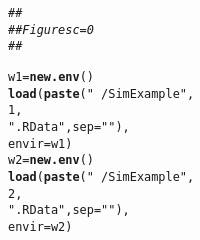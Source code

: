 \documentclass[12pt,letterpaper,final]{article}\usepackage[]{graphicx}\usepackage[]{color}
\makeatletter
\newcommand{\hlnum}[1]{\textcolor[rgb]{0.686,0.059,0.569}{#1}}%
\newcommand{\hlstr}[1]{\textcolor[rgb]{0.192,0.494,0.8}{#1}}%
\newcommand{\hlcom}[1]{\textcolor[rgb]{0.678,0.584,0.686}{\textit{#1}}}%
\newcommand{\hlstd}[1]{\textcolor[rgb]{0.345,0.345,0.345}{#1}}%
\newcommand{\hlkwb}[1]{\textcolor[rgb]{0.69,0.353,0.396}{#1}}%
\newcommand{\hlkwc}[1]{\textcolor[rgb]{0.333,0.667,0.333}{#1}}%
\newcommand{\hlkwd}[1]{\textcolor[rgb]{0.737,0.353,0.396}{\textbf{#1}}}%
\newenvironment{kframe}{%
 \def\at@end@of@kframe{}%
 \ifinner\ifhmode%
  \def\at@end@of@kframe{\end{minipage}}%
  \begin{minipage}{\columnwidth}%
 \fi\fi%
 \def\FrameCommand##1{\hskip\@totalleftmargin \hskip-\fboxsep
 \colorbox{shadecolor}{##1}\hskip-\fboxsep
     \hskip-\linewidth \hskip-\@totalleftmargin \hskip\columnwidth}%
 \MakeFramed {\advance\hsize-\width
   \@totalleftmargin\z@ \linewidth\hsize
   \@setminipage}}%
 {\par\unskip\endMakeFramed%
 \at@end@of@kframe}
\newenvironment{knitrout}{}{} %
\makeatother
\begin{document}
\begin{knitrout}
\color{fgcolor}\begin{kframe}
\begin{alltt}
\hlcom{##}
\hlcom{## Figures c=0}
\hlcom{##}

\hlstd{w1}\hlkwb{=}\hlkwd{new.env}\hlstd{()}
\hlkwd{load}\hlstd{(}\hlkwd{paste}\hlstd{(}\hlstr{"~/SimExample"}\hlstd{,}
           \hlnum{1}\hlstd{,}
           \hlstr{".RData"}\hlstd{,}\hlkwc{sep}\hlstd{=}\hlstr{""}\hlstd{),}
     \hlkwc{envir}\hlstd{=w1)}
\hlstd{w2}\hlkwb{=}\hlkwd{new.env}\hlstd{()}
\hlkwd{load}\hlstd{(}\hlkwd{paste}\hlstd{(}\hlstr{"~/SimExample"}\hlstd{,}
           \hlnum{2}\hlstd{,}
           \hlstr{".RData"}\hlstd{,}\hlkwc{sep}\hlstd{=}\hlstr{""}\hlstd{),}
     \hlkwc{envir}\hlstd{=w2)}


\end{alltt}
\end{kframe}
\end{knitrout}
\end{document}
